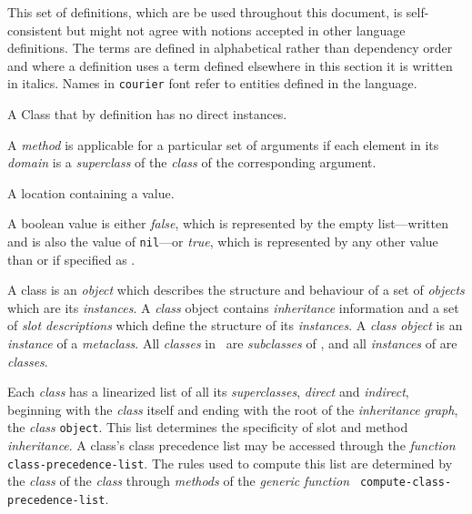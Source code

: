 \begin{optPrivate}
\end{optPrivate}
\begin{optDefinition}
\label{sec:definitions}
This set of definitions, which are be used throughout this document, is
self-consistent but might not agree with notions accepted in other language
definitions.  The terms are defined in alphabetical rather than dependency order
and where a definition uses a term defined elsewhere in this section it is
written in italics.  Names in {\tt courier} font refer to entities defined in
the language.
%
\begin{definitions}
    A Class that by definition has no direct instances.

     
     A {\em method} is applicable for a
    particular set of arguments if each element in its {\em domain} is a {\em
        superclass} of the {\em class} of the corresponding argument.

    A location containing a value.

     A boolean value is either {\em
        false}, which is represented by the empty
    list---written \nil\/ and is also the value of {\tt nil}---or {\em
        true}, which is represented by any other value than
    \nil or if specified as \true.

     A class is an {\em object} which
    describes the structure and behaviour of a set of {\em objects} which are
    its {\em instances}.  A {\em class} object contains {\em inheritance}
    information and a set of {\em slot descriptions} which define the structure
    of its {\em instances}.  A {\em class} {\em object} is an {\em instance} of
    a {\em metaclass}.  All {\em classes} in \eulisp\ are {\em subclasses} of
    {}, and all {\em instances} of {} are {\em
        classes}.

     
    Each {\em class} has a linearized list of all its {\em superclasses}, {\em
        direct} and {\em indirect}, beginning with the {\em class} itself and
    ending with the root of the {\em inheritance} {\em graph}, the {\em class}
    {\tt object}.  This list determines the specificity of slot and method {\em
        inheritance}.  A class's class precedence list may be accessed through
    the {\em function} {\tt class-precedence-list}. The rules used to compute
    this list are determined by the {\em class} of the {\em class} through {\em
        methods} of the {\em generic} {\em function} {\tt
        compute-class-precedence-list}.


\end{definitions}
\end{optDefinition}
